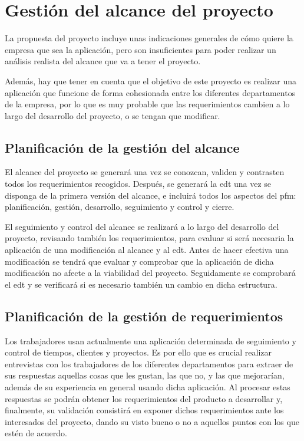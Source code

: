 \section{Gestión del alcance del proyecto}
La propuesta del proyecto incluye unas indicaciones generales de cómo quiere
la empresa que sea la aplicación, pero son insuficientes para poder realizar
un análisis realista del alcance que va a tener el proyecto.

Además, hay que tener en cuenta que el objetivo de este proyecto es realizar
una aplicación que funcione de forma cohesionada entre los diferentes
departamentos de la empresa, por lo que es muy probable que las
requerimientos cambien a lo largo del desarrollo del proyecto, o se tengan
que modificar.

\subsection{Planificación de la gestión del alcance}
El alcance del proyecto se generará una vez se conozcan, validen y contrasten
todos los requerimientos recogidos. Después, se generará la \gls{edt} una vez
se disponga de la primera versión del alcance, e incluirá todos los aspectos
del \gls{pfm}: planificación, gestión, desarrollo, seguimiento y control y
cierre.

El seguimiento y control del alcance se realizará a lo largo del desarrollo
del proyecto, revisando también los requerimientos, para evaluar si será
necesaria la aplicación de una modificación al alcance y al \gls{edt}. Antes de
hacer efectiva una modificación se tendrá que evaluar y comprobar que la
aplicación de dicha modificación no afecte a la viabilidad del proyecto.
Seguidamente se comprobará el \gls{edt} y se verificará si es necesario también
un cambio en dicha estructura.

\subsection{Planificación de la gestión de requerimientos}
Los trabajadores usan actualmente una aplicación determinada de seguimiento y
control de tiempos, clientes y proyectos. Es por ello que es crucial realizar
entrevistas con los trabajadores de los diferentes departamentos para extraer
de sus respuestas aquellas cosas que les gustan, las que no, y las que
mejorarían, además de su experiencia en general usando dicha aplicación. Al
procesar estas respuestas se podrán obtener los requerimientos del producto
a desarrollar y, finalmente, su validación consistirá en exponer dichos
requerimientos ante los interesados del proyecto, dando su visto bueno o no
a aquellos puntos con los que estén de acuerdo.

